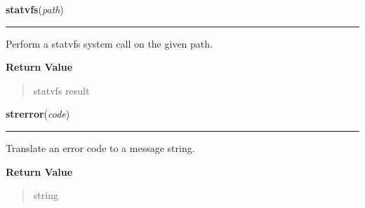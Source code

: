     \label{os:statvfs}

    \vspace{0.5ex}

\hspace{.8\funcindent}\begin{boxedminipage}{\funcwidth}

    \raggedright \textbf{statvfs}(\textit{path})

    \vspace{-1.5ex}

    \rule{\textwidth}{0.5\fboxrule}
\setlength{\parskip}{2ex}
    Perform a statvfs system call on the given path.

\setlength{\parskip}{1ex}
      \textbf{Return Value}
    \vspace{-1ex}

      \begin{quote}
      statvfs result

      \end{quote}

    \end{boxedminipage}

    \label{os:strerror}

    \vspace{0.5ex}

\hspace{.8\funcindent}\begin{boxedminipage}{\funcwidth}

    \raggedright \textbf{strerror}(\textit{code})

    \vspace{-1.5ex}

    \rule{\textwidth}{0.5\fboxrule}
\setlength{\parskip}{2ex}
    Translate an error code to a message string.

\setlength{\parskip}{1ex}
      \textbf{Return Value}
    \vspace{-1ex}

      \begin{quote}
      string

      \end{quote}

    \end{boxedminipage}

    \label{os:symlink}

    \vspace{0.5ex}


